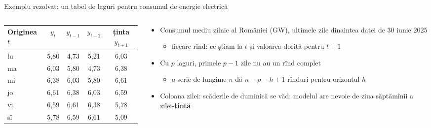 \begin{frame}{Exemplu rezolvat: un tabel de laguri pentru consumul de energie electrică}
\itemsize{\footnotesize}
\begin{columns}[T]
\begin{column}{0.5\textwidth}
\begin{center}
\footnotesize
\begin{tabular}{lcccc}
\toprule
\textbf{Originea $t$} & $y_t$ & $y_{t-1}$ & $y_{t-2}$ & \textbf{ținta} $y_{t+1}$ \\
\midrule
lu & 5{,}80 & 4{,}73 & 5{,}21 & 6{,}03 \\
ma & 6{,}03 & 5{,}80 & 4{,}73 & 6{,}38 \\
mi & 6{,}38 & 6{,}03 & 5{,}80 & 6{,}61 \\
jo & 6{,}61 & 6{,}38 & 6{,}03 & 6{,}59 \\
vi & 6{,}59 & 6{,}61 & 6{,}38 & 5{,}78 \\
sî & 5{,}78 & 6{,}59 & 6{,}61 & 5{,}09 \\
\bottomrule
\end{tabular}
\end{center}

\end{column}
\begin{column}{0.48\textwidth}
\begin{itemize}
    \item Consumul mediu zilnic al României (GW), ultimele zile dinaintea datei de 30 iunie 2025
    \begin{itemize}
        \item fiecare rînd: ce știam la $t$ și valoarea dorită pentru $t+1$
    \end{itemize}
    \item Cu $p$ laguri, primele $p - 1$ zile nu au un rînd complet
    \begin{itemize}
        \item o serie de lungime $n$ dă $n - p - h + 1$ rînduri pentru orizontul $h$
    \end{itemize}
    \item Coloana zilei: scăderile de duminică se văd; modelul are nevoie de ziua săptămînii a zilei-\textbf{țintă}
\end{itemize}
\end{column}
\end{columns}
\end{frame}

